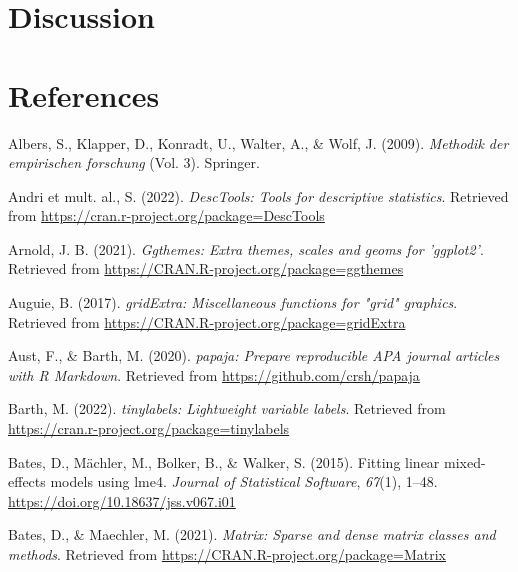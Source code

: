 \documentclass[
  man]{apa6}
\newlength{\cslhangindent}
\newlength{\cslentryspacingunit} %
\newenvironment{CSLReferences}[2] %
 {%
  \setlength{\parindent}{0pt}
  \ifodd #1
  \let\oldpar\par
  \def\par{\hangindent=\cslhangindent\oldpar}
  \fi
  \setlength{\parskip}{#2\cslentryspacingunit}
 }%
 {}
\begin{document}
\hypertarget{discussion}{%
\section{Discussion}\label{discussion}}

\newpage

\hypertarget{references}{%
\section{References}\label{references}}

\begingroup
\setlength{\parindent}{-0.5in}
\setlength{\leftskip}{0.5in}

\hypertarget{refs}{}
\begin{CSLReferences}{1}{0}
\leavevmode{}%
Albers, S., Klapper, D., Konradt, U., Walter, A., \& Wolf, J. (2009). \emph{Methodik der empirischen forschung} (Vol. 3). Springer.

\leavevmode{}%
Andri et mult. al., S. (2022). \emph{{DescTools}: Tools for descriptive statistics}. Retrieved from \url{https://cran.r-project.org/package=DescTools}

\leavevmode{}%
Arnold, J. B. (2021). \emph{Ggthemes: Extra themes, scales and geoms for 'ggplot2'}. Retrieved from \url{https://CRAN.R-project.org/package=ggthemes}

\leavevmode{}%
Auguie, B. (2017). \emph{gridExtra: Miscellaneous functions for "grid" graphics}. Retrieved from \url{https://CRAN.R-project.org/package=gridExtra}

\leavevmode{}%
Aust, F., \& Barth, M. (2020). \emph{{papaja}: {Prepare} reproducible {APA} journal articles with {R Markdown}}. Retrieved from \url{https://github.com/crsh/papaja}

\leavevmode{}%
Barth, M. (2022). \emph{{tinylabels}: Lightweight variable labels}. Retrieved from \url{https://cran.r-project.org/package=tinylabels}

\leavevmode{}%
Bates, D., Mächler, M., Bolker, B., \& Walker, S. (2015). Fitting linear mixed-effects models using {lme4}. \emph{Journal of Statistical Software}, \emph{67}(1), 1--48. \url{https://doi.org/10.18637/jss.v067.i01}

\leavevmode{}%
Bates, D., \& Maechler, M. (2021). \emph{Matrix: Sparse and dense matrix classes and methods}. Retrieved from \url{https://CRAN.R-project.org/package=Matrix}


\end{CSLReferences}
\end{document}
